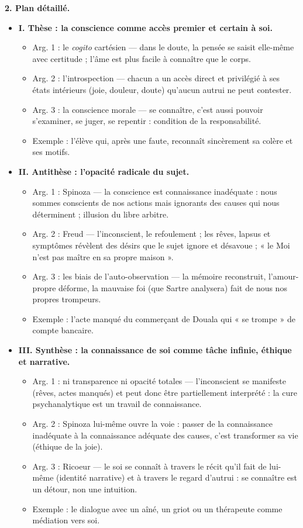 \documentclass[11pt]{article}
\begin{document}
\begin{corrige}
\textbf{2. Plan détaillé.}
\begin{itemize}
\item \textbf{I. Thèse : la conscience comme accès premier et certain à soi.}
\begin{itemize}
\item Arg. 1 : le \emph{cogito} cartésien — dans le doute, la pensée se saisit elle-même avec certitude ; l'âme est plus facile à connaître que le corps.
\item Arg. 2 : l'introspection — chacun a un accès direct et privilégié à ses états intérieurs (joie, douleur, doute) qu'aucun autrui ne peut contester.
\item Arg. 3 : la conscience morale — se connaître, c'est aussi pouvoir s'examiner, se juger, se repentir : condition de la responsabilité.
\item Exemple : l'élève qui, après une faute, reconnaît sincèrement sa colère et ses motifs.
\end{itemize}
\item \textbf{II. Antithèse : l'opacité radicale du sujet.}
\begin{itemize}
\item Arg. 1 : Spinoza — la conscience est connaissance inadéquate : nous sommes conscients de nos actions mais ignorants des causes qui nous déterminent ; illusion du libre arbitre.
\item Arg. 2 : Freud — l'inconscient, le refoulement ; les rêves, lapsus et symptômes révèlent des désirs que le sujet ignore et désavoue ; « le Moi n'est pas maître en sa propre maison ».
\item Arg. 3 : les biais de l'auto-observation — la mémoire reconstruit, l'amour-propre déforme, la mauvaise foi (que Sartre analysera) fait de nous nos propres trompeurs.
\item Exemple : l'acte manqué du commerçant de Douala qui « se trompe » de compte bancaire.
\end{itemize}
\item \textbf{III. Synthèse : la connaissance de soi comme tâche infinie, éthique et narrative.}
\begin{itemize}
\item Arg. 1 : ni transparence ni opacité totales — l'inconscient se manifeste (rêves, actes manqués) et peut donc être partiellement interprété : la cure psychanalytique est un travail de connaissance.
\item Arg. 2 : Spinoza lui-même ouvre la voie : passer de la connaissance inadéquate à la connaissance adéquate des causes, c'est transformer sa vie (éthique de la joie).
\item Arg. 3 : Ricoeur — le soi se connaît à travers le récit qu'il fait de lui-même (identité narrative) et à travers le regard d'autrui : se connaître est un détour, non une intuition.
\item Exemple : le dialogue avec un aîné, un griot ou un thérapeute comme médiation vers soi.
\end{itemize}
\end{itemize}


\end{corrige}
\end{document}
